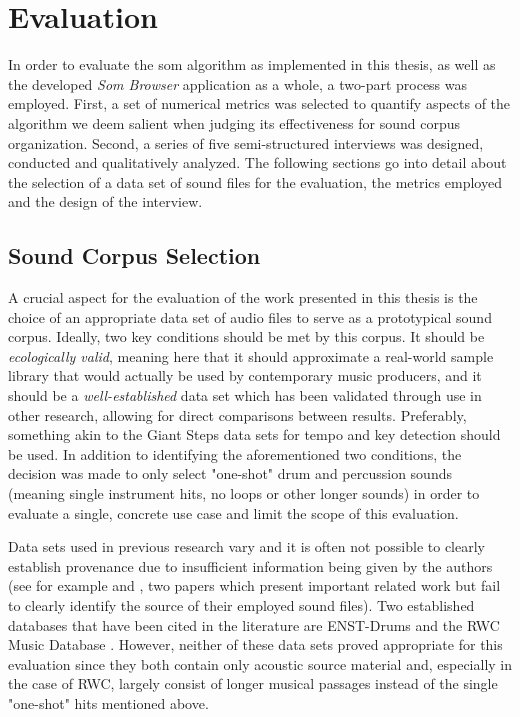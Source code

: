 
\section{Evaluation}
\label{sec:evaluation}
In order to evaluate the \gls{som} algorithm as implemented in this thesis, as
well as the developed \textit{Som Browser} application as a whole, a two-part
process was employed. First, a set of numerical metrics was selected to quantify
aspects of the algorithm we deem salient when judging its effectiveness for
sound corpus organization. Second, a series of five semi-structured interviews
was designed, conducted and qualitatively analyzed. The following sections go
into detail about the selection of a data set of sound files for the evaluation,
the metrics employed and the design of the interview.

\subsection{Sound Corpus Selection}
\label{subsec:eval_corpus_selection}
A crucial aspect for the evaluation of the work presented in this thesis is the
choice of an appropriate data set of audio files to serve as a prototypical
sound corpus. Ideally, two key conditions should be met by this corpus. It
should be \textit{ecologically valid}, meaning here that it should approximate a
real-world sample library that would actually be used by contemporary music
producers, and it should be a \textit{well-established} data set which has been
validated through use in other research, allowing for direct comparisons between
results. Preferably, something akin to the Giant Steps data sets
\citep{knees2015} for tempo and key detection should be used.
In addition to identifying the aforementioned two conditions, the decision was
made to only select "one-shot" drum and percussion sounds (meaning single
instrument hits, no loops or other longer sounds) in order to evaluate a single,
concrete use case and limit the scope of this evaluation.

\smallskip

Data sets used in previous research vary and it is often not possible to clearly
establish provenance due to insufficient information being given by the authors
(see for example \citet{fried2014} and \citet{shier2017}, two papers which
present important related work but fail to clearly identify the source of their
employed sound files). Two established databases that have been cited in the
literature are ENST-Drums \citep{gillet2006} and the RWC Music Database
\citep{goto2002}. However, neither of these data sets proved appropriate for
this evaluation since they both contain only acoustic source material and,
especially in the case of RWC, largely consist of longer musical passages
instead of the single "one-shot" hits mentioned above.

